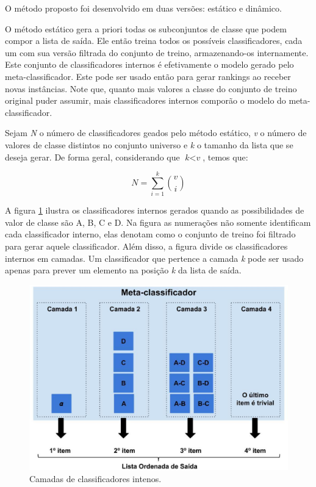 \documentclass[dissertacao,brazil]{ThesisPUC}
\begin{document}
O método proposto foi desenvolvido em duas versões: estático e dinâmico.

O método estático gera a priori todas os subconjuntos de classe que podem compor a lista de saída. Ele então treina todos os possíveis classificadores, cada um com sua versão filtrada do conjunto de treino, armazenando-os internamente. Este conjunto de classificadores internos é efetivamente o modelo gerado pelo meta-classificador. Este pode ser usado então para gerar rankings ao receber novas instâncias. Note que, quanto mais valores a classe do conjunto de treino original puder assumir, mais classificadores internos comporão o modelo do meta-classificador.

Sejam \textit{N} o número de classificadores geados pelo método estático, \textit{v} o número de valores de classe distintos no conjunto universo e \textit{k} o tamanho da lista que se deseja gerar. De forma geral, considerando que $\textit{k} < \textit{v}$, temos que:

\begin{equation*}

\textit{N} = \sum\limits_{i=1}^k \binom{v}{i}

\end{equation*}

A figura \ref{fig:metodoproposto03} ilustra os classificadores internos gerados quando as possibilidades de valor de classe são A, B, C e D. Na figura as numerações não somente identificam cada classificador interno, elas denotam como o conjunto de treino foi filtrado para gerar aquele classificador. Além disso, a figura divide os classificadores internos em camadas. Um classificador que pertence a camada \textit{k} pode ser usado apenas para prever um elemento na posição \textit{k} da lista de saída.

\begin{figure}[h!]
  \includegraphics[width=\linewidth]{images/metodoproposto03.eps}
  \caption{Camadas de classificadores intenos.}
  \label{fig:metodoproposto03}
\end{figure}
\end{document}
